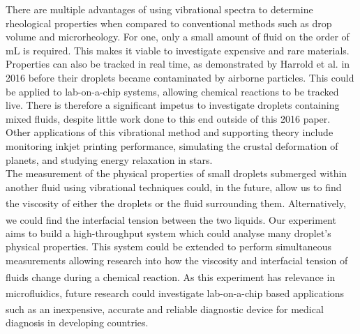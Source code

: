 \documentclass{physics_article_B}
\begin{document}
There are multiple advantages of using vibrational spectra to determine rheological properties when compared to conventional methods such as drop volume and microrheology. For one, only a small amount of fluid on the order of mL\cite{temperton2014mechanical} is required. This makes it viable to investigate expensive and rare materials. Properties can also be tracked in real time, as demonstrated by Harrold et al. in 2016\cite{harrold2016optovibrometry} before their droplets became contaminated by airborne particles. This could be applied to lab-on-a-chip systems, allowing chemical reactions to be tracked live. There is therefore a significant impetus to investigate droplets containing mixed fluids, despite little work done to this end outside of this 2016 paper. Other applications of this vibrational method and supporting theory include monitoring inkjet printing performance\cite{martin2008inkjet}, simulating the crustal deformation of planets\cite{background}, and studying energy relaxation in stars\cite{background}.\\

The measurement of the physical properties of small droplets submerged within another fluid using vibrational techniques could, in the future, allow us to find the viscosity of either the droplets or the fluid surrounding them\textsuperscript{\cite{backholm}}. Alternatively, we could find the interfacial tension between the two liquids\textsuperscript{\cite{backholm}}. Our experiment aims to build a high-throughput system which could analyse many droplet's physical properties. This system could be extended to perform simultaneous measurements allowing research into how the viscosity and interfacial tension of fluids change during a chemical reaction\textsuperscript{\cite{backholm}}. As this experiment has relevance in microfluidics, future research could investigate lab-on-a-chip based applications\textsuperscript{\cite{tempertonphd}} such as an inexpensive, accurate and reliable diagnostic device\textsuperscript{\cite{yager}} for medical diagnosis in developing countries.
\end{document}
